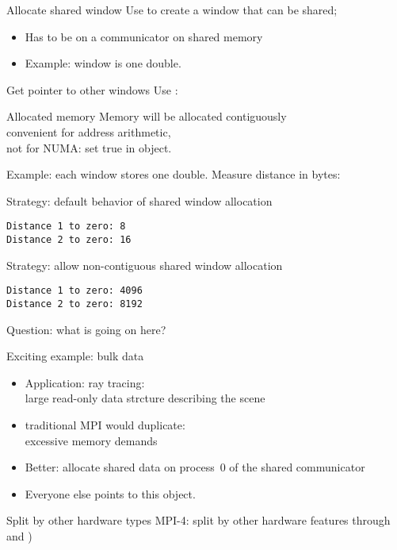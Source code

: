 \begin{numberedframe}{Allocate shared window}
Use  to create a window that can
be shared;
\begin{itemize}
\item Has to be on a communicator on shared memory
\item Example: window is one double.
\end{itemize}
\end{numberedframe}

\begin{numberedframe}{Get pointer to other windows}
  Use :
\end{numberedframe}


\begin{numberedframe}{Allocated memory}
  Memory will be allocated contiguously\\
  convenient for address arithmetic,\\ not for NUMA:
  set  true in
   object.  

  Example: each window stores one double. Measure distance in bytes:
  \begin{multicols}{2}
    Strategy: default behavior of shared window allocation
\begin{verbatim}
Distance 1 to zero: 8
Distance 2 to zero: 16
\end{verbatim}
\columnbreak
Strategy: allow non-contiguous shared window allocation
\begin{verbatim}
Distance 1 to zero: 4096
Distance 2 to zero: 8192
\end{verbatim}
  \end{multicols}
Question: what is going on here?
\end{numberedframe}

\begin{numberedframe}{Exciting example: bulk data}
  \begin{itemize}
  \item Application: ray tracing:\\
    large read-only data strcture describing the scene
  \item traditional MPI would duplicate:\\
    excessive memory demands
  \item Better: allocate shared data on process~0 of the shared communicator
  \item Everyone else points to this object.
  \end{itemize}
\end{numberedframe}

\begin{numberedframe}{Split by other hardware types}
  MPI-4: split by other hardware features through 
  and )
\end{numberedframe}

